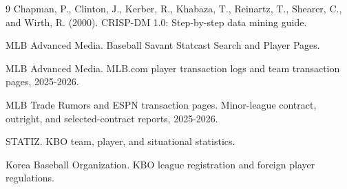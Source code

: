 \documentclass[11pt,a4paper]{article}
\begin{document}
\clearpage
\begin{thebibliography}{9}
Chapman, P., Clinton, J., Kerber, R., Khabaza, T., Reinartz, T., Shearer, C., and Wirth, R. (2000). CRISP-DM 1.0: Step-by-step data mining guide.

MLB Advanced Media. Baseball Savant Statcast Search and Player Pages.

MLB Advanced Media. MLB.com player transaction logs and team transaction pages, 2025-2026.

MLB Trade Rumors and ESPN transaction pages. Minor-league contract, outright, and selected-contract reports, 2025-2026.

STATIZ. KBO team, player, and situational statistics.

Korea Baseball Organization. KBO league registration and foreign player regulations.
\end{thebibliography}
\end{document}
